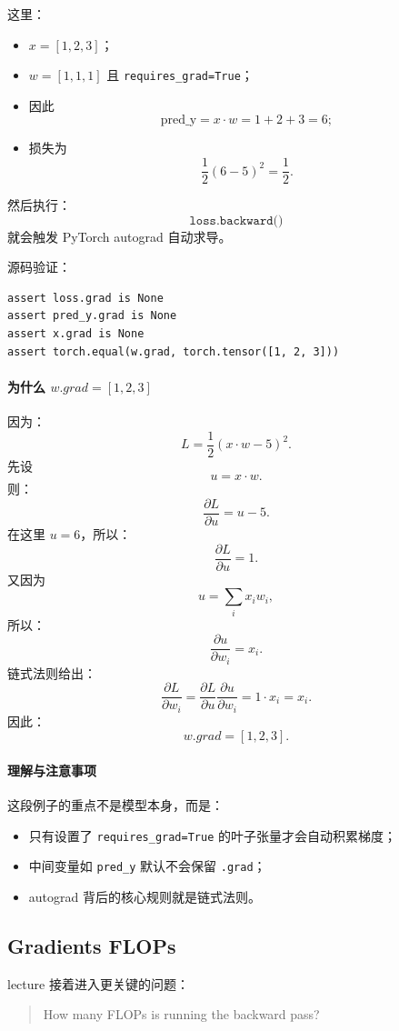 \documentclass[a4paper,UTF8]{article}
\numberwithin{equation}{section}
\begin{document}
这里：
\begin{itemize}
    \item \(x = [1,2,3]\)；
    \item \(w = [1,1,1]\) 且 \verb|requires_grad=True|；
    \item 因此
    \[
    \text{pred\_y} = x \cdot w = 1+2+3 = 6;
    \]
    \item 损失为
    \[
    \frac12 (6-5)^2 = \frac12.
    \]
\end{itemize}

然后执行：
\[
\texttt{loss.backward()}
\]
就会触发 PyTorch autograd 自动求导。

源码验证：
\begin{verbatim}
assert loss.grad is None
assert pred_y.grad is None
assert x.grad is None
assert torch.equal(w.grad, torch.tensor([1, 2, 3]))
\end{verbatim}

\paragraph{为什么 \(w.grad = [1,2,3]\)}
因为：
\[
L = \frac12 (x \cdot w - 5)^2.
\]
先设
\[
u = x \cdot w.
\]
则：
\[
\frac{\partial L}{\partial u} = u-5.
\]
在这里 \(u=6\)，所以：
\[
\frac{\partial L}{\partial u} = 1.
\]
又因为
\[
u = \sum_i x_i w_i,
\]
所以：
\[
\frac{\partial u}{\partial w_i} = x_i.
\]
链式法则给出：
\[
\frac{\partial L}{\partial w_i}
=
\frac{\partial L}{\partial u}
\frac{\partial u}{\partial w_i}
=
1 \cdot x_i = x_i.
\]
因此：
\[
w.grad = [1,2,3].
\]

\paragraph{理解与注意事项}
这段例子的重点不是模型本身，而是：
\begin{itemize}
    \item 只有设置了 \verb|requires_grad=True| 的叶子张量才会自动积累梯度；
    \item 中间变量如 \verb|pred_y| 默认不会保留 \verb|.grad|；
    \item autograd 背后的核心规则就是链式法则。
\end{itemize}

\subsection{Gradients FLOPs}

lecture 接着进入更关键的问题：
\begin{quote}
How many FLOPs is running the backward pass?
\end{quote}
\end{document}
